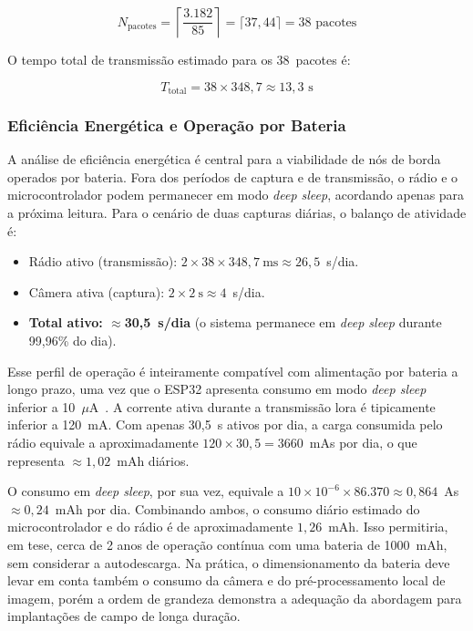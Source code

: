\begin{equation}
  \label{eq:pacotes}
  N_{\text{pacotes}} = \left\lceil \frac{3{.}182}{85} \right\rceil = \lceil 37{,}44 \rceil = 38 \text{ pacotes}
\end{equation}
 
O tempo total de transmissão estimado para os 38~pacotes é:
 
\begin{equation}
  \label{eq:ttotal}
  T_{\text{total}} = 38 \times 348{,}7 \approx 13{,}3 \text{ s}
\end{equation}

\subsubsection{Eficiência Energética e Operação por Bateria}

A análise de eficiência energética é central para a viabilidade de nós de borda
operados por bateria. Fora dos períodos de captura e de transmissão, o rádio e o
microcontrolador podem permanecer em modo \textit{deep sleep}, acordando apenas
para a próxima leitura. Para o cenário de duas capturas diárias, o balanço de
atividade é:

\begin{itemize}
  \item Rádio ativo (transmissão): $2 \times 38 \times 348{,}7~\text{ms} \approx 26{,}5$~s/dia.
  \item Câmera ativa (captura): $2 \times 2~\text{s} \approx 4$~s/dia.
  \item \textbf{Total ativo: $\approx$30,5~s/dia} (o sistema permanece em \textit{deep sleep}
        durante 99,96\% do dia).
\end{itemize}

Esse perfil de operação é inteiramente compatível com alimentação por bateria a longo
prazo, uma vez que o ESP32 apresenta consumo em modo \textit{deep sleep} inferior a
10~$\mu$A~\cite{adam2022}. A corrente ativa durante a transmissão \gls{lora} é
tipicamente inferior a 120~mA. Com apenas 30,5~s ativos por dia, a carga consumida
pelo rádio equivale a aproximadamente $120 \times 30{,}5 = 3660$~mAs
por dia, o que representa $\approx 1{,}02$~mAh diários.

O consumo em \textit{deep sleep}, por sua vez, equivale a $10 \times 10^{-6} \times
86{.}370 \approx 0{,}864$~As~$\approx 0{,}24$~mAh por dia. Combinando ambos, o
consumo diário estimado do microcontrolador e do rádio é de aproximadamente $1{,}26$~mAh.
Isso permitiria, em tese, cerca de 2 anos de operação contínua com uma bateria de 1000~mAh,
sem considerar a autodescarga. Na prática, o dimensionamento da bateria deve levar em conta
também o consumo da câmera e do pré-processamento local de imagem,
porém a ordem de grandeza demonstra a adequação da abordagem para implantações
de campo de longa duração.

